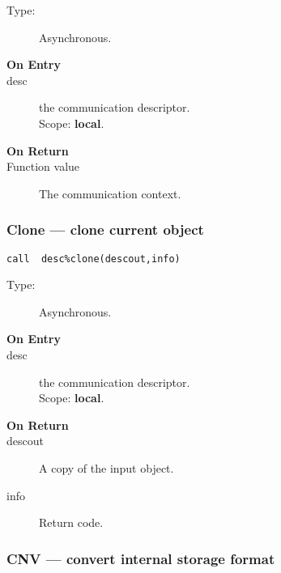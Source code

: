 \begin{description}
\item[Type:] Asynchronous.
\item[\bf On Entry]
\item[desc] the communication descriptor.\\
Scope: {\bf local}.\\
\end{description}

\begin{description}
\item[\bf On Return]
\item[Function value] The communication context.
\end{description}

\subsubsection*{Clone --- clone current object}

\begin{verbatim}
call  desc%clone(descout,info)
\end{verbatim}

\begin{description}
\item[Type:] Asynchronous.
\item[\bf On Entry]
\item[desc] the communication descriptor.\\
Scope: {\bf local}.\\
\end{description}

\begin{description}
\item[\bf On Return]
\item[descout] A copy of the input object.
\item[info] Return code. 
\end{description}


\subsubsection*{CNV --- convert internal storage format}

